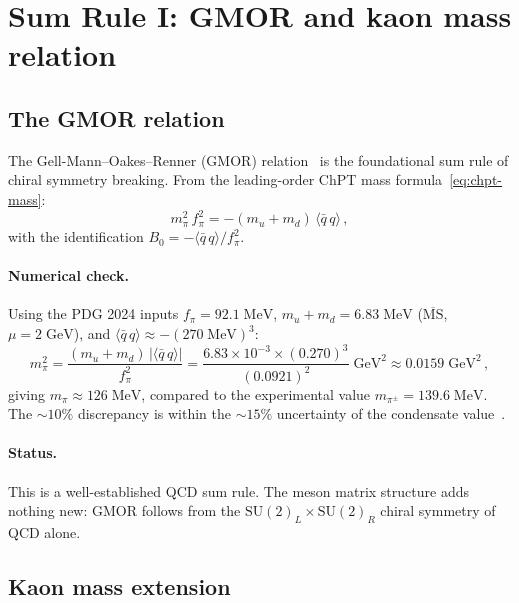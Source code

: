 \documentclass[11pt,a4paper]{article}
\newcommand{\SU}[1]{\mathrm{SU}(#1)}
\newcommand{\qqbar}{\langle \bar{q}\,q \rangle}
\newcommand{\fpi}{f_\pi}
\theoremstyle{plain}
\begin{document}
\section{Sum Rule I: GMOR and kaon mass relation}
\label{sec:gmor}

\subsection{The GMOR relation}

The Gell-Mann--Oakes--Renner (GMOR)
relation~\cite{GellMannOakesRenner1968} is the foundational sum rule
of chiral symmetry breaking.  From the leading-order ChPT mass
formula~\eqref{eq:chpt-mass}:
\begin{equation}\label{eq:gmor}
  \boxed{m_\pi^2\,\fpi^2 = -(m_u + m_d)\,\qqbar\,,}
\end{equation}
with the identification $B_0 = -\qqbar/\fpi^2$.

\paragraph{Numerical check.}
Using the PDG 2024 inputs $\fpi = 92.1\;\text{MeV}$,
$m_u + m_d = 6.83\;\text{MeV}$ ($\overline{\text{MS}}$, $\mu = 2\;\text{GeV}$),
and $\qqbar \approx -(270\;\text{MeV})^3$:
\begin{equation}\label{eq:gmor-check}
  m_\pi^2 = \frac{(m_u + m_d)\,|\qqbar|}{\fpi^2}
  = \frac{6.83 \times 10^{-3} \times (0.270)^3}{(0.0921)^2}\;\text{GeV}^2
  \approx 0.0159\;\text{GeV}^2\,,
\end{equation}
giving $m_\pi \approx 126\;\text{MeV}$, compared to the experimental
value $m_{\pi^\pm} = 139.6\;\text{MeV}$.  The $\sim 10\%$ discrepancy
is within the $\sim 15\%$ uncertainty of the condensate
value~\cite{FLAG2024}.

\paragraph{Status.} This is a well-established QCD sum rule.  The meson
matrix structure adds nothing new: GMOR follows from the
$\SU{2}_L \times \SU{2}_R$ chiral symmetry of QCD alone.

\subsection{Kaon mass extension}
\end{document}
